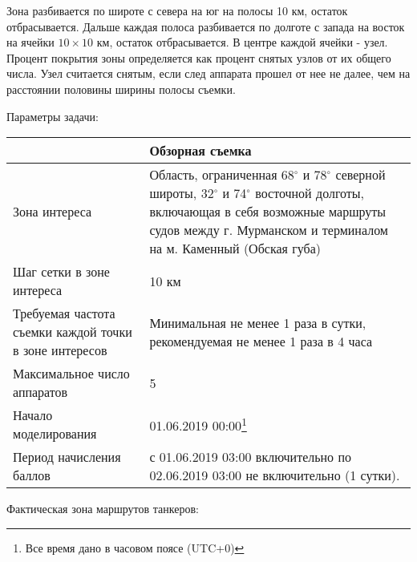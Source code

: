 Зона разбивается по широте с севера на юг на полосы 10 км, остаток отбрасывается. Дальше каждая полоса разбивается по долготе с запада на восток на ячейки $10 \times 10$ км, остаток отбрасывается. В центре каждой ячейки - узел. Процент покрытия зоны определяется как процент снятых узлов от их общего числа. Узел считается снятым, если след аппарата прошел от нее не далее, чем на расстоянии половины ширины полосы съемки. 

Параметры задачи:

\begin{table}[H]
    \center
    \begin{tabular}{|p{5cm}|p{10cm}|}
        \hline
        &Обзорная съемка \\
        \hline
        Зона интереса & Область, ограниченная 68$^\circ$ и 78$^\circ$ северной широты, 32$^\circ$ и 74$^\circ$  восточной долготы, включающая в себя возможные маршруты судов между г. Мурманском и терминалом на м. Каменный (Обская губа) \\
        \hline
        Шаг сетки в зоне интереса & 10 км \\
        \hline
        Требуемая частота съемки каждой точки в зоне интересов & Минимальная не менее 1 раза в сутки, рекомендуемая не менее 1 раза в 4 часа \\
        \hline
        Максимальное число аппаратов & 5 \\
        \hline
        Начало моделирования & 01.06.2019 00:00\footnote{Все время дано в часовом поясе (UTC+0)}     \\
        \hline
        Период начисления баллов & с 01.06.2019 03:00 включительно по 02.06.2019 03:00 не включительно (1 сутки). \\
        \hline
    \end{tabular}
\end{table}

Фактическая зона маршрутов танкеров:


\markSection

